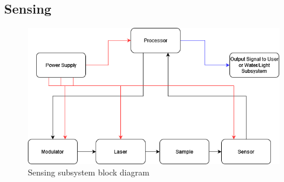\subsection{Sensing}
\begin{figure}[H]
    \caption{Sensing subsystem block diagram}
    \centering
    \includegraphics[width=\textwidth]{block-diagrams/images/IRSensorBlockDiagram.drawio.png}
\end{figure}